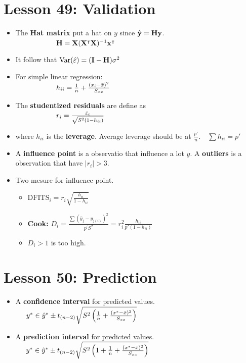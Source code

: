 \documentclass[10pt, french]{article}
\begin{document}
\begin{multicols*}{3}
\section*{Lesson 49: Validation} 
\begin{itemize}[align=left,leftmargin=*]
   \item The \textbf{Hat matrix} put a hat on $y$ since $\hat{\mathbf{y}} = \mathbf{H}\mathbf{y}$. \\
   $\hspace*{2cm} \mathbf{H} = \mathbf{X}(\mathbf{X}^\intercal\mathbf{X})^{-1}\mathbf{x}^\intercal$
   \item It follow that $\mathrm{Var} {\left( \hat{\varepsilon} \right)} = (\mathbf{I} - \mathbf{H})\sigma^2$
   \item For simple linear regression: \\
   $\hspace*{2cm}h_{ii} = \frac{1}{n} + \frac{(x_i - \bar{x})^2}{S_{xx}}$
   \item The \textbf{studentized residuals} are define as \\
   $\hspace*{2cm} r_i = \frac{\hat{\varepsilon}_i}{\sqrt{S^2(1 - h_{ii})}}$
   \item[] where $h_{ii}$ is the \textbf{leverage}. Average leverage should be at $\frac{p'}{n}$.$\quad \sum h_{ii} = p'$
   \item A \textbf{influence point} is a observatio that influence a lot $y$. A \textbf{outliers} is a observation that have $|r_i|>3$. 
   \item Two mesure for influence point.
   \begin{itemize}
      \item $\mathrm{DFITS}_i = r_i \sqrt{\frac{h_{ii}}{1- h_{ii}}}$
      \item \textbf{Cook:} $D_i =\frac{\sum (\hat{y}_j - y_{j(i)})^2}{p^{'}S^2} =r_i^2 \frac{h_{ii}}{p'(1 - h_{ii})}$
      \item[] $D_i>1$ is too high. 
   \end{itemize}
 \end{itemize} 
 
\section*{Lesson 50: Prediction}
\begin{itemize}[align=left,leftmargin=*]
    \item A \textbf{confidence interval} for predicted values. \\
    $\hspace*{0.5cm}y^{*} \in \hat{y}^{*} \pm t_{(n-2)} \sqrt{S^2\left(\frac{1}{n}+\frac{(x^{*} - \bar{x})^2}{S_{xx}}\right)}$
    \item A \textbf{prediction interval} for predicted values. \\
    $\hspace*{0.5cm}y^{*} \in \hat{y}^{*} \pm t_{(n-2)} \sqrt{S^2\left(1+\frac{1}{n}+\frac{(x^{*} - \bar{x})^2}{S_{xx}}\right)}$
\end{itemize}
 

\end{multicols*}
\end{document}
